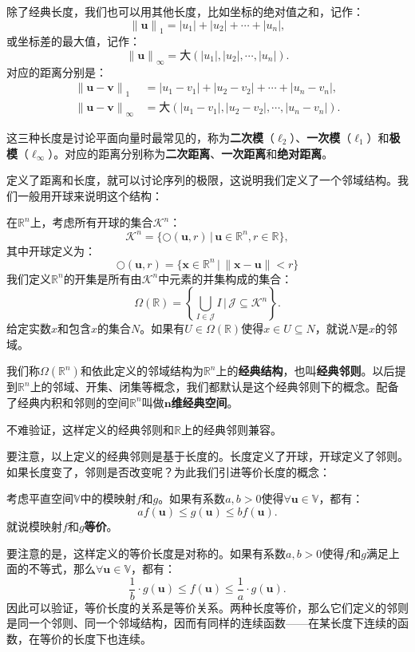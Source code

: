 \documentclass[12pt,UTF8,fontset=none]{ctexbook}
\begin{document}
除了经典长度，我们也可以用其他长度，比如坐标的绝对值之和，记作：
$$ \left\|\mathbf{u}\right\|_1 = |u_1| + |u_2| + \cdots + |u_n|,$$
或坐标差的最大值，记作：
$$ \left\| \mathbf{u} \right\|_{\infty} = \text{大}(|u_1|, |u_2|,\cdots, |u_n|). $$
对应的距离分别是：
\begin{align*}
    \left\|\mathbf{u} - \mathbf{v}\right\|_1\;\, &= |u_1 - v_1| + |u_2 - v_2| + \cdots + |u_n - v_n|,\\
    \left\| \mathbf{u} - \mathbf{v} \right\|_{\infty} &= \text{大}(|u_1 - v_1|, |u_2 - v_2|,\cdots, |u_n - v_n|).   
\end{align*}
 
这三种长度是讨论平面向量时最常见的，称为\textbf{二次模}（$\ell_2$）、\textbf{一次模}（$\ell_1$）和\textbf{极模}（$\ell_{\infty}$）。对应的距离分别称为\textbf{二次距离}、\textbf{一次距离}和\textbf{绝对距离}。

定义了距离和长度，就可以讨论序列的极限，这说明我们定义了一个邻域结构。我们一般用开球来说明这个结构：
\begin{df}
    在$\mathbb{R}^n$上，考虑所有开球的集合$\mathcal{K}^n$：
    $$ \mathcal{K}^n = \{ \bigcirc(\mathbf{u}, r) \, | \, \mathbf{u} \in \mathbb{R}^n, r \in \mathbb{R} \},$$
    其中开球定义为：
    $$ \bigcirc(\mathbf{u},r) = \{ \mathbf{x}\in \mathbb{R}^n\,|\, \| \mathbf{x} - \mathbf{u}\| < r\} $$
    我们定义$\mathbb{R}^n$的开集是所有由$\mathcal{K}^n$中元素的并集构成的集合：
    $$ \Omega(\mathbb{R}) = \left\{\bigcup_{I \in \mathcal{J}} I \, \Bigg| \,\mathcal{J} \subseteq  \mathcal{K}^n \right\}.$$
    给定实数$x$和包含$x$的集合$N$。如果有$U\in\Omega(\mathbb{R})$使得$x\in U\subseteq N$，就说$N$是$x$的邻域。

    我们称$\Omega(\mathbb{R}^n)$和依此定义的邻域结构为$\mathbb{R}^n$上的\textbf{经典结构}，也叫\textbf{经典邻则}。以后提到$\mathbb{R}^n$上的邻域、开集、闭集等概念，我们都默认是这个经典邻则下的概念。配备了经典内积和邻则的空间$\mathbb{R}^n$叫做$\boldsymbol{n}$\textbf{维经典空间}。
\end{df}

不难验证，这样定义的经典邻则和$\mathbb{R}$上的经典邻则兼容。

要注意，以上定义的经典邻则是基于长度的。长度定义了开球，开球定义了邻则。如果长度变了，邻则是否改变呢？为此我们引进等价长度的概念：
\begin{df}
    考虑平直空间$\mathbb{V}$中的模映射$f$和$g$。如果有系数$a,b>0$使得$\forall \mathbf{u} \in \mathbb{V}$，都有：
    $$ af(\mathbf{u}) \leqslant g(\mathbf{u}) \leqslant bf(\mathbf{u}).$$
    就说模映射$f$和$g$\textbf{等价}。
\end{df}
要注意的是，这样定义的等价长度是对称的。如果有系数$a,b>0$使得$f$和$g$满足上面的不等式，那么$\forall \mathbf{u} \in \mathbb{V}$，都有：
$$ \frac{1}{b}\cdot g(\mathbf{u}) \leqslant f(\mathbf{u}) \leqslant \frac{1}{a}\cdot g(\mathbf{u}). $$
因此可以验证，等价长度的关系是等价关系。两种长度等价，那么它们定义的邻则是同一个邻则、同一个邻域结构，因而有同样的连续函数——在某长度下连续的函数，在等价的长度下也连续。
\end{document}
